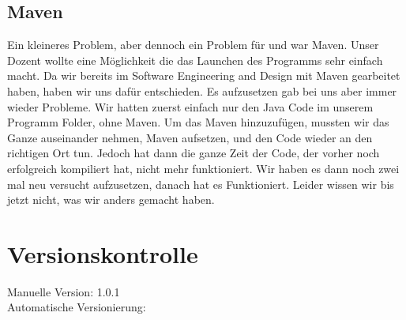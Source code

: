 \documentclass[11pt,titelpage]{scrartcl}
\begin{document}
\subsection{Maven}
Ein kleineres Problem, aber dennoch ein Problem für und war Maven. Unser Dozent wollte eine Möglichkeit die das Launchen des Programms sehr einfach macht. Da wir bereits im Software Engineering and Design mit Maven gearbeitet
haben, haben wir uns dafür entschieden. Es aufzusetzen gab bei uns aber immer wieder Probleme. Wir hatten zuerst einfach nur den Java Code im unserem Programm Folder, ohne Maven. Um das Maven hinzuzufügen, mussten wir das Ganze
auseinander nehmen, Maven aufsetzen, und den Code wieder an den richtigen Ort tun. Jedoch hat dann die ganze Zeit der Code, der vorher noch erfolgreich kompiliert hat, nicht mehr funktioniert. Wir haben es dann noch zwei mal neu
versucht aufzusetzen, danach hat es Funktioniert. Leider wissen wir bis jetzt nicht, was wir anders gemacht haben.



\section{Versionskontrolle}
Manuelle Version: 1.0.1
\\

\noindent
Automatische Versionierung:
\immediate{}

\immediate{}
\end{document}

